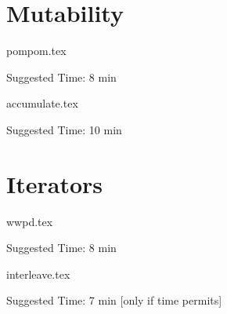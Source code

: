 \documentclass{exam}
\begin{document}
\section{Mutability}
\begin{questions}


    {pompom.tex}
    \begin{questionmeta}
        Suggested Time: 8 min
    \end{questionmeta}

    {accumulate.tex}
    \begin{questionmeta}
        Suggested Time: 10 min
    \end{questionmeta}
\end{questions}


\section{Iterators}

\begin{questions}
{wwpd.tex}
    \begin{questionmeta}
        Suggested Time: 8 min
    \end{questionmeta}

    {interleave.tex}
    \begin{questionmeta}
        Suggested Time: 7 min [only if time permits]
    \end{questionmeta}
\end{questions}
\end{document}
